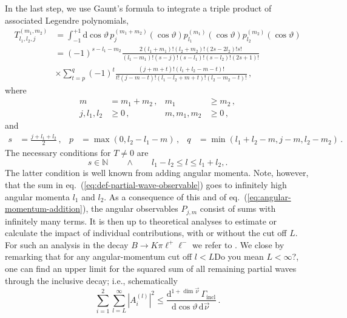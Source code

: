 \documentclass[aps,prd,reprint,nofootinbib,preprintnumbers]{revtex4}
\newcommand{\rmdx}[1]{\mbox{d} #1 \,} %
\newcommand{\refeq}[1]{eq.~(\ref{eq:#1})}
\renewcommand{\theta}{\vartheta}
\newcommand{\fred}[1]{{\color{brown!85!black}#1}}
\begin{document}
In the last step, we use Gaunt's formula \cite{Gaunt:1929} to integrate a triple product of associated Legendre polynomials,
\begin{equation}
\begin{aligned}
    T_{l_1,l_2,j}^{(m_1,m_2)}
        & = \int_{-1}^{+1} \rmdx{\cos\theta} p_{j}^{(m_1 + m_2)}(\cos\theta) p_{l_1}^{(m_1)}(\cos\theta) p_{l_2}^{(m_2)}(\cos\theta)\\
        & = (-1)^{s - l_1 - m_2} \frac{2 (l_1 + m_1)! (l_2 + m_2)! (2s - 2 l_2)! s!}{(l_1 - m_1)! (s - j)! (s - l_1)! (s - l_2)! (2s + 1)!}\\
        & \times \sum_{t=p}^q (-1)^t \frac{(j + m + t)!(l_1 + l_2 - m - t)!}{t! (j - m - t)! (l_1 - l_2 + m + t)! (l_2 - m_2 - t)!}\,,
\end{aligned}
\end{equation}
where
\begin{equation}
\begin{aligned}
    m & = m_1 + m_2\,, &
    m_1 & \geq m_2\,,  \\
    j, l_1, l_2 & \geq 0\,, &
    m, m_1, m_2 & \geq 0\,,
\end{aligned}
\end{equation}
and
\begin{equation}
\begin{aligned}
    s & = \frac{j + l_1 + l_2}{2}\,, &
    p & = \max(0, l_2 - l_1 - m)\,, &
    q & = \min(l_1 + l_2 - m, j - m, l_2 - m_2)\,.
\end{aligned}
\end{equation}
The necessary conditions for $T \neq 0$ are
\begin{equation}
    \label{eq:angular-momentum-addition}
    s \in \mathbb{N}\qquad \wedge \qquad l_1 - l_2 \leq l \leq l_1 + l_2,.
\end{equation}
The latter condition is well known from adding angular momenta. Note, however, that
the sum in \refeq{def-partial-wave-observable} goes to infinitely high angular momenta $l_1$ and $l_2$. As a consequence
of this and of \refeq{angular-momentum-addition}, the angular observables $P_{j,m}$
consist of sums with infinitely many terms. It is then up to theoretical analyses to
estimate or calculate the impact of individual contributions, with or without the cut off $L$.
For such an analysis in the decay $B\to K\pi\ell^+\ell^-$ we refer to \cite{Das:2014sra}.
We close by remarking that for any angular-momentum cut off $l < L$\fred{Do you mean $L < \infty$?}, one can find an upper limit for the squared sum
of all remaining partial waves through the inclusive decay; i.e., schematically
\begin{equation}
    \sum_{i=1}^2 \sum_{l=L}^\infty |A_i^{(l)}|^2 \leq \frac{\rmdx{^{1 + \dim\vec\nu}} \Gamma_\text{incl}}{\rmdx{\cos\theta} \rmdx{\vec\nu}}\,.
\end{equation}



\end{document}

